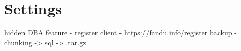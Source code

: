 \section{Settings}
	hidden DBA feature - register client - https://fandu.info/register
	backup - chunking -> sql -> .tar.gz